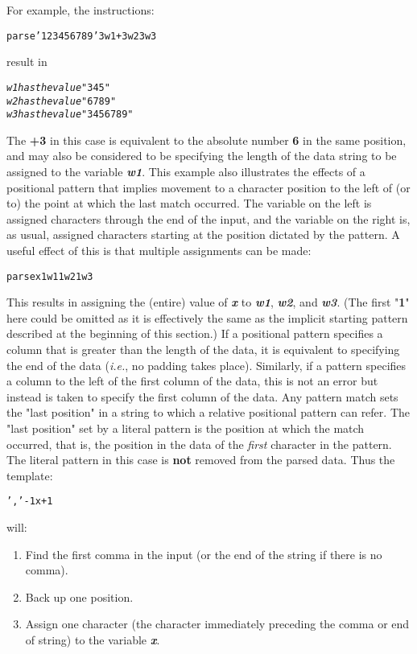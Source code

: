 For example, the instructions:
\begin{alltt}
parse '123456789'  3 w1 +3 w2 3 w3
\end{alltt}
result in
\begin{alltt}
\emph{w1} \emph{has the value} "345"
\emph{w2} \emph{has the value} "6789"
\emph{w3} \emph{has the value} "3456789"
\end{alltt}
The \textbf{+3} in this case is equivalent to the absolute
number \textbf{6} in the same position, and may also be considered to
be specifying the length of the data string to be assigned to the
variable \textbf{\emph{w1}}.
 This example also illustrates the effects of a positional pattern
that implies movement to a character position to the left of (or to)
the point at which the last match occurred.
The variable on the left is assigned characters through the end of the
input, and the variable on the right is, as usual, assigned characters
starting at the position dictated by the pattern.
 A useful effect of this is that multiple assignments can be made:
\begin{alltt}
parse x 1 w1 1 w2 1 w3
\end{alltt}
This results in assigning the (entire) value
of \textbf{\emph{x}}
to \textbf{\emph{w1}}, \textbf{\emph{w2}},
and \textbf{\emph{w3}}.
(The first "\textbf{1}" here could be omitted as it is
effectively the same as the implicit starting pattern described at the
beginning of this section.)
 If a positional pattern specifies a column that is greater than the
length of the data, it is equivalent to specifying the end of the data
(\emph{i.e.}, no padding takes place).
Similarly, if a pattern specifies a column to the left of the first
column of the data, this is not an error but instead is taken to
specify the first column of the data.
 Any pattern match sets the "last position" in a string to which
a relative positional pattern can refer.
The "last position" set by a literal pattern is the position at
which the match occurred, that is, the position in the data of the
\emph{first} character in the pattern.
The literal pattern in this case is \textbf{not} removed from the
parsed data.
Thus the template:
\begin{alltt}
',' -1 x +1
\end{alltt}
 will:
\begin{enumerate}
\item Find the first comma in the input (or the end of the string if
there is no comma).
\item Back up one position.
\item Assign one character (the character immediately preceding the comma
or end of string) to the variable \textbf{\emph{x}}.
\end{enumerate}
